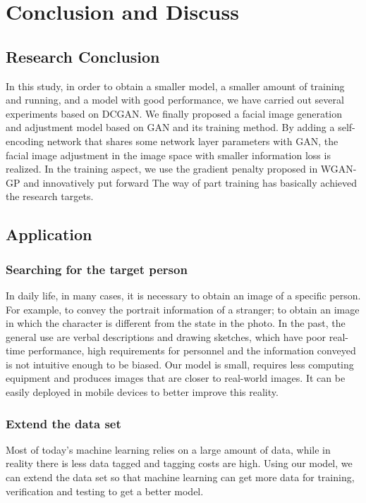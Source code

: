 \section{Conclusion and Discuss}
\subsection{Research Conclusion}
In this study, in order to obtain a smaller model, a smaller amount of training and running, and a model with good performance, we have carried out several experiments based on DCGAN. We finally proposed a facial image generation and adjustment model based on GAN and its training method. By adding a self-encoding network that shares some network layer parameters with GAN, the facial image adjustment in the image space with smaller information loss is realized. In the training aspect, we use the gradient penalty proposed in WGAN-GP and innovatively put forward The way of part training has basically achieved the research targets.

\subsection{Application}
\subsubsection*{Searching for the target person}
In daily life, in many cases, it is necessary to obtain an image of a specific person. 
For example, to convey the portrait information of a stranger; to obtain an image in which the character is different from the state in the photo. 
In the past, the general use are verbal descriptions and drawing sketches, which have poor real-time performance, high requirements for personnel and the information conveyed is not intuitive enough to be biased.
Our model is small, requires less computing equipment and produces images that are closer to real-world images. It can be easily deployed in mobile devices to better improve this reality.
\subsubsection*{Extend the data set}
Most of today's machine learning relies on a large amount of data, while in reality there is less data tagged and tagging costs are high.
Using our model, we can extend the data set so that machine learning can get more data for training, verification and testing to get a better model.
